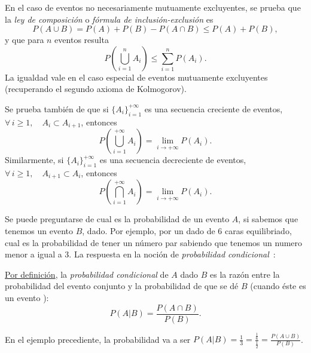 En el caso de eventos no necesariamente mutuamente excluyentes, se prueba que la
{\it ley de composici\'on} o {\it f\'ormula de inclusi\'on-exclusi\'on} es
%
\[
P(A \cup B) = P(A) + P(B) - P(A \cap B) \leq P(A) + P(B), 
\]
%
y que para $n$ eventos resulta
%
\[
P\left( \bigcup_{i=1}^n A_i \right) \leq \sum_{i=1}^n P\left( A_i \right).
\]
%
La  igualdad  vale  en  el  caso  especial  de  eventos  mutuamente  excluyentes
(recuperando el segundo axioma de Kolmogorov).

Se  prueba tambi\'en  de que  si $\{  A_i \}_{i=1}^{+\infty}$  es  una secuencia
creciente  de eventos,  \ie $\forall  \, i  \ge 1,  \quad A_i  \subset A_{i+1}$,
entonces
%
\[
P\left( \bigcup_{i=1}^{+\infty} A_i \right) = \lim_{i \to +\infty} P(A_i).
\]
%
Similarmente,  si $\{ A_i  \}_{i=1}^{+\infty}$ es  una secuencia  decreciente de
eventos, \ie $\forall \, i \ge 1, \quad A_{i+1} \subset A_i$, entonces
%
\[
P\left( \bigcap_{i=1}^{+\infty} A_i \right) = \lim_{i \to +\infty} P(A_i).
\]

Se puede preguntarse de cual es la probabilidad de un evento $A$, si sabemos que
tenemos un evento $B$, dado.  Por  ejemplo, por un dado de 6 caras equilibriado,
cual es la probabilidad de tener  un n\'umero par sabiendo que tenemos un numero
menor  a  igual a 3.  La respuesta  en la noci\'on
de  {\it probabilidad condicional}~\cite{Hau01,  Jef48, Jef73,  Bre88, ManWol95,
  JacPro03, ShaVov06}:
%
\begin{definicion}\label{Def:MP:ProbaCondicional}
  \underline{Por definici\'on},  la {\it  probabilidad condicional} de  $A$ dado
  $B$ es la raz\'on entre la  probabilidad del evento conjunto y la probabilidad
  de  que se  d\'e $B$  (cuando \'este  es un  evento ):
  \[
  P(A|B) = \frac{P(A \cap B)}{P(B)}.
  \]
\end{definicion}
%
En  el  ejemplo precediente,  la  probabilidad  va a  ser  $P(A|B)  = \frac13  =
\frac{\frac16}{\frac12}  = \frac{P(A  \cup B)}{P(B)}$. 

